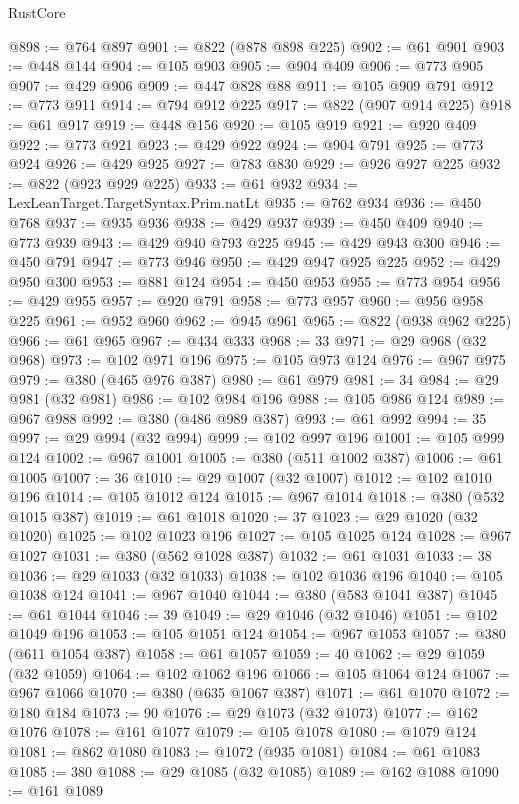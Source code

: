 \begin{lexlean}{RustCore}
\begin{coremodule}
{\begin{coremodule}
{{{{{{{{{{{{{{{{{{{{{{{{{{{{{{{{{{{{{{{{{{{{{@898 := @764 @897
@901 := @822 (@878 @898 @225)
@902 := @61 @901
@903 := @448 @144
@904 := @105 @903
@905 := @904 @409
@906 := @773 @905
@907 := @429 @906
@909 := @447 @828 @88
@911 := @105 @909 @791
@912 := @773 @911
@914 := @794 @912 @225
@917 := @822 (@907 @914 @225)
@918 := @61 @917
@919 := @448 @156
@920 := @105 @919
@921 := @920 @409
@922 := @773 @921
@923 := @429 @922
@924 := @904 @791
@925 := @773 @924
@926 := @429 @925
@927 := @783 @830
@929 := @926 @927 @225
@932 := @822 (@923 @929 @225)
@933 := @61 @932
@934 := LexLeanTarget.TargetSyntax.Prim.natLt
@935 := @762 @934
@936 := @450 @768
@937 := @935 @936
@938 := @429 @937
@939 := @450 @409
@940 := @773 @939
@943 := @429 @940 @793 @225
@945 := @429 @943 @300
@946 := @450 @791
@947 := @773 @946
@950 := @429 @947 @925 @225
@952 := @429 @950 @300
@953 := @881 @124
@954 := @450 @953
@955 := @773 @954
@956 := @429 @955
@957 := @920 @791
@958 := @773 @957
@960 := @956 @958 @225
@961 := @952 @960
@962 := @945 @961
@965 := @822 (@938 @962 @225)
@966 := @61 @965
@967 := @434 @333
@968 := 33
@971 := @29 @968 (@32 @968)
@973 := @102 @971 @196
@975 := @105 @973 @124
@976 := @967 @975
@979 := @380 (@465 @976 @387)
@980 := @61 @979
@981 := 34
@984 := @29 @981 (@32 @981)
@986 := @102 @984 @196
@988 := @105 @986 @124
@989 := @967 @988
@992 := @380 (@486 @989 @387)
@993 := @61 @992
@994 := 35
@997 := @29 @994 (@32 @994)
@999 := @102 @997 @196
@1001 := @105 @999 @124
@1002 := @967 @1001
@1005 := @380 (@511 @1002 @387)
@1006 := @61 @1005
@1007 := 36
@1010 := @29 @1007 (@32 @1007)
@1012 := @102 @1010 @196
@1014 := @105 @1012 @124
@1015 := @967 @1014
@1018 := @380 (@532 @1015 @387)
@1019 := @61 @1018
@1020 := 37
@1023 := @29 @1020 (@32 @1020)
@1025 := @102 @1023 @196
@1027 := @105 @1025 @124
@1028 := @967 @1027
@1031 := @380 (@562 @1028 @387)
@1032 := @61 @1031
@1033 := 38
@1036 := @29 @1033 (@32 @1033)
@1038 := @102 @1036 @196
@1040 := @105 @1038 @124
@1041 := @967 @1040
@1044 := @380 (@583 @1041 @387)
@1045 := @61 @1044
@1046 := 39
@1049 := @29 @1046 (@32 @1046)
@1051 := @102 @1049 @196
@1053 := @105 @1051 @124
@1054 := @967 @1053
@1057 := @380 (@611 @1054 @387)
@1058 := @61 @1057
@1059 := 40
@1062 := @29 @1059 (@32 @1059)
@1064 := @102 @1062 @196
@1066 := @105 @1064 @124
@1067 := @967 @1066
@1070 := @380 (@635 @1067 @387)
@1071 := @61 @1070
@1072 := @180 @184
@1073 := 90
@1076 := @29 @1073 (@32 @1073)
@1077 := @162 @1076
@1078 := @161 @1077
@1079 := @105 @1078
@1080 := @1079 @124
@1081 := @862 @1080
@1083 := @1072 (@935 @1081)
@1084 := @61 @1083
@1085 := 380
@1088 := @29 @1085 (@32 @1085)
@1089 := @162 @1088
@1090 := @161 @1089
}}}}}}}}}}}}}}}}}}}}}}}}}}}}}}}}}}}}}}}}}}}}}
\end{coremodule}}
\end{coremodule}
\end{lexlean}
